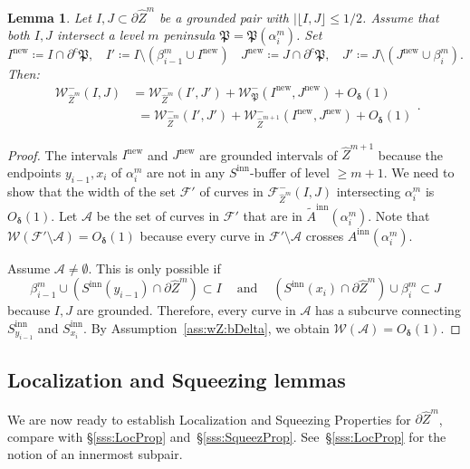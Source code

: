 \documentclass{amsart}
\renewcommand{\sp}{{\ \ }}
\newcommand{\1}{{\mathbb 1 }}
\newcommand{\Fam}{{\mathcal F}}
\newcommand{\Width}{{\mathcal W}}
\newcommand{\wZ}{{\widehat Z}}
\newcommand\inn{{\operatorname{inn}}}
\renewcommand\AA{\mathcal{A}}
\newcommand\new{{\operatorname{new}}}
\newtheorem{lem}[thm]{Lemma}
\theoremstyle{remark}
\numberwithin{equation}{section}
\theoremstyle{definition}
\newcommand{\Penin}{{\mathfrak P}}
\newcommand{\bdelta}{{\boldsymbol{ \delta}}}
\begin{document}
\begin{lem}
\label{lmm:gound inter:penins}
Let $I,J\subset \partial \wZ^m$ be a grounded pair with $|\lfloor I,J\rfloor \le 1/2$.
 Assume that both $I,J$ intersect a level $m$ peninsula $\Penin=\Penin(\alpha^m_i)$. Set \[I^\new\coloneqq I\cap \partial^c \Penin , \sp\sp I'\coloneqq I\setminus(\beta^m_{i-1}\cup I^\new) \sp\sp J^\new \coloneqq J\cap \partial^c\Penin,\sp\sp J'\coloneqq J\setminus (J^\new\cup \beta^m_i).\] Then: 
\[\begin{array}{cc}
\Width^-_{\wZ^m}(I,J)&=\Width^-_{\wZ^m}(I',J') + \Width_\Penin^-(I^\new, J^\new)+O_\bdelta(1)\\
&\sp=\Width^-_{\wZ^m}(I',J') + \Width_{\wZ^{m+1}}^-(I^\new, J^\new)+O_\bdelta(1)
\end{array}.\]
\end{lem}
\begin{proof}
 The intervals $I^\new$ and $J^\new$ are grounded intervals of $\wZ^{m+1}$ because the endpoints $y_{i-1},x_i$ of $\alpha^m_i$ are not in any $S^\inn$-buffer of level $\ge m+1$. We need to show that the width of the set $\Fam'$ of curves in $\Fam^-_{\wZ^m}(I,J)$ intersecting $\alpha^m_i$ is $O_\bdelta(1)$. Let $\AA$ be the set of curves in $\Fam'$ that are in $\widetilde A^\inn(\alpha^m_i)$. Note that $\Width(\Fam' \setminus \AA)= O_\bdelta(1)$ because every curve in $\Fam'\setminus \AA$ crosses $A^\inn(\alpha^m_i)$.

Assume $\AA\not=\emptyset$. This is only possible if
\[\beta^m_{i-1} \cup (S^\inn(y_{i-1})\cap \partial \wZ^m) \subset I\sp\sp\text{ and }\sp\sp (S^\inn(x_{i})\cap \partial \wZ^m) \cup \beta^m_{i}  \subset J\]
because $I,J$ are grounded. Therefore, every curve in $\AA$ has a subcurve connecting $S^\inn _{y_{i-1}}$ and $S^\inn _{x_{i}}$. By Assumption~\ref{ass:wZ:bDelta}, we obtain $\Width(\AA)= O_\bdelta(1)$.
\end{proof}



\subsection{Localization and Squeezing lemmas} 
\label{ss:wZ:local lmm}
We are now ready to establish Localization and Squeezing Properties for $\partial \wZ^m$, compare with \S\ref{sss:LocProp} and~\S\ref{sss:SqueezProp}. See~\S\ref{sss:LocProp} for the notion of an innermost subpair.
\end{document}
